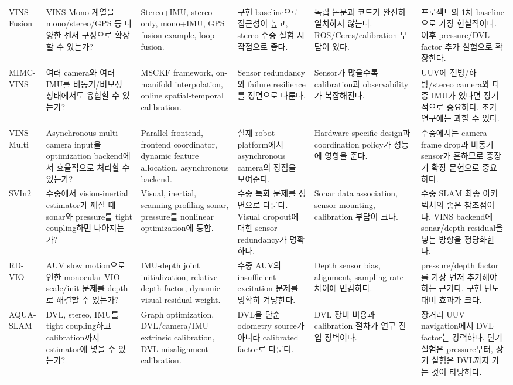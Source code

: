 \documentclass[11pt,a4paper]{article}
\begin{document}
\begin{landscape}
\begin{longtable}{p{29mm}p{34mm}p{38mm}p{42mm}p{42mm}p{44mm}}
VINS-Fusion \cite{vinsfusiongithub}
& VINS-Mono 계열을 mono/stereo/GPS 등 다양한 센서 구성으로 확장할 수 있는가?
& Stereo+IMU, stereo-only, mono+IMU, GPS fusion example, loop fusion.
& 구현 baseline으로 접근성이 높고, stereo 수중 실험 시작점으로 좋다.
& 독립 논문과 코드가 완전히 일치하지 않는다. ROS/Ceres/calibration 부담이 있다.
& 프로젝트의 1차 baseline으로 가장 현실적이다. 이후 pressure/DVL factor 추가 실험으로 확장한다. \\

MIMC-VINS \cite{eckenhoff2021mimcvins}
& 여러 camera와 여러 IMU를 비동기/비보정 상태에서도 융합할 수 있는가?
& MSCKF framework, on-manifold interpolation, online spatial-temporal calibration.
& Sensor redundancy와 failure resilience를 정면으로 다룬다.
& Sensor가 많을수록 calibration과 observability가 복잡해진다.
& UUV에 전방/하방/stereo camera와 다중 IMU가 있다면 장기적으로 중요하다. 초기 연구에는 과할 수 있다. \\

VINS-Multi \cite{wang2024vinsmulti}
& Asynchronous multi-camera input을 optimization backend에서 효율적으로 처리할 수 있는가?
& Parallel frontend, frontend coordinator, dynamic feature allocation, asynchronous backend.
& 실제 robot platform에서 asynchronous camera의 장점을 보여준다.
& Hardware-specific design과 coordination policy가 성능에 영향을 준다.
& 수중에서는 camera frame drop과 비동기 sensor가 흔하므로 중장기 확장 문헌으로 중요하다. \\

SVIn2 \cite{rahman2022svin2}
& 수중에서 vision-inertial estimator가 깨질 때 sonar와 pressure를 tight coupling하면 나아지는가?
& Visual, inertial, scanning profiling sonar, pressure를 nonlinear optimization에 통합.
& 수중 특화 문제를 정면으로 다룬다. Visual dropout에 대한 sensor redundancy가 명확하다.
& Sonar data association, sensor mounting, calibration 부담이 크다.
& 수중 SLAM 최종 아키텍처의 좋은 참조점이다. VINS backend에 sonar/depth residual을 넣는 방향을 정당화한다. \\

RD-VIO \cite{li2023rdvio}
& AUV slow motion으로 인한 monocular VIO scale/init 문제를 depth로 해결할 수 있는가?
& IMU-depth joint initialization, relative depth factor, dynamic visual residual weight.
& 수중 AUV의 insufficient excitation 문제를 명확히 겨냥한다.
& Depth sensor bias, alignment, sampling rate 차이에 민감하다.
& pressure/depth factor를 가장 먼저 추가해야 하는 근거다. 구현 난도 대비 효과가 크다. \\

AQUA-SLAM \cite{xu2025aquaslam}
& DVL, stereo, IMU를 tight coupling하고 calibration까지 estimator에 넣을 수 있는가?
& Graph optimization, DVL/camera/IMU extrinsic calibration, DVL misalignment calibration.
& DVL을 단순 odometry source가 아니라 calibrated factor로 다룬다.
& DVL 장비 비용과 calibration 절차가 연구 진입 장벽이다.
& 장거리 UUV navigation에서 DVL factor는 강력하다. 단기 실험은 pressure부터, 장기 실험은 DVL까지 가는 것이 타당하다. \\


\end{longtable}
\end{landscape}
\end{document}
